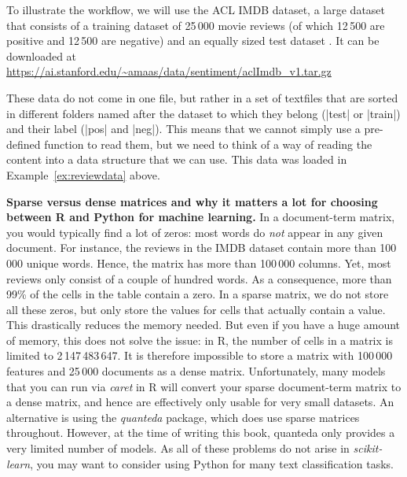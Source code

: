 To illustrate the workflow, we will use the ACL IMDB dataset, a large
dataset that consists  of a training dataset of 25\,000 movie
reviews (of which 12\,500 are positive  and 12\,500 are negative)
and an equally sized test dataset \citep{aclimdb}. It can be
downloaded at
\url{https://ai.stanford.edu/~amaas/data/sentiment/aclImdb_v1.tar.gz}


These data do not come in one file, but rather in a set of textfiles
that are sorted in different folders named after the dataset to which they
belong  (|test| or |train|) and their label (|pos| and |neg|). This
means that we cannot simply use a pre-defined function to read them,
but we need to think of a way of reading the content into a
data structure that we can use.
This data was loaded in Example~\ref{ex:reviewdata} above.

\label{feature:sparse}
\begin{feature}
  \textbf{Sparse versus dense matrices and why it matters a lot for
    choosing between R and Python for machine learning.} In a
  document-term matrix, you would typically find a lot of zeros: most
  words do \emph{not} appear in any given document. For instance, the
  reviews in the IMDB dataset contain more than 100\,000 unique
  words. Hence, the matrix has more than 100\,000 columns. Yet, most
  reviews only consist of a couple of hundred words. As a
  consequence, more than 99\% of the cells in the table contain a
  zero. In a sparse matrix, we do not store all these zeros, but only
  store the values for cells that actually contain a value. This
  drastically reduces the memory needed.  But even if you have a huge
  amount of memory, this does not solve the issue: in R, the number of
  cells in a matrix is limited to 2\,147\,483\,647. It is therefore
  impossible to store a matrix with 100\,000 features and 25\,000
  documents as a dense matrix. Unfortunately, many models that you can
  run via \emph{caret} in R will convert your sparse document-term
  matrix to a dense matrix, and hence are effectively only usable for
  very small datasets. An alternative is using the \emph{quanteda} package,
  which does use sparse matrices throughout. However, at the time of
  writing this book, quanteda only provides a very limited number of
  models. As all of these problems do not arise in \emph{scikit-learn},
  you may want to consider using Python for many text classification tasks.
\end{feature}


